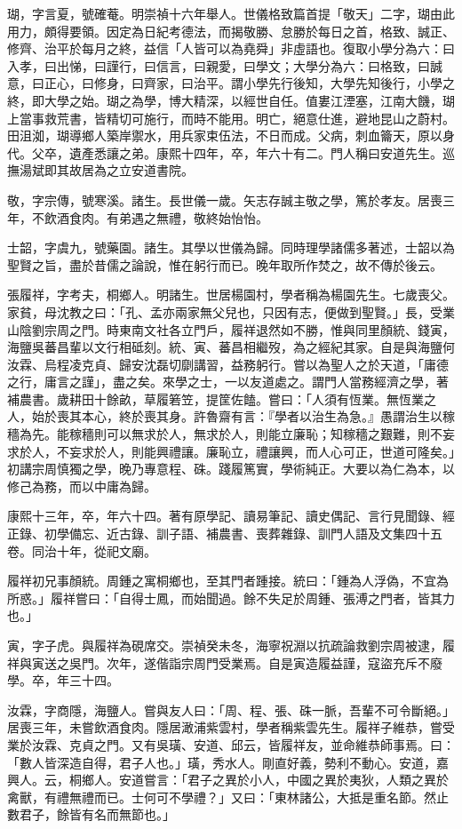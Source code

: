 \begin{pinyinscope}
瑚，字言夏，號確菴。明崇禎十六年舉人。世儀格致篇首提「敬天」二字，瑚由此用力，頗得要領。因定為日紀考德法，而揭敬勝、怠勝於每日之首，格致、誠正、修齊、治平於每月之終，益信「人皆可以為堯舜」非虛語也。復取小學分為六：曰入孝，曰出悌，曰謹行，曰信言，曰親愛，曰學文；大學分為六：曰格致，曰誠意，曰正心，曰修身，曰齊家，曰治平。謂小學先行後知，大學先知後行，小學之終，即大學之始。瑚之為學，博大精深，以經世自任。值婁江湮塞，江南大饑，瑚上當事救荒書，皆精切可施行，而時不能用。明亡，絕意仕進，避地昆山之蔚村。田沮洳，瑚導鄉人築岸禦水，用兵家束伍法，不日而成。父病，刺血籥天，原以身代。父卒，遺產悉讓之弟。康熙十四年，卒，年六十有二。門人稱曰安道先生。巡撫湯斌即其故居為之立安道書院。

敬，字宗傳，號寒溪。諸生。長世儀一歲。矢志存誠主敬之學，篤於孝友。居喪三年，不飲酒食肉。有弟遇之無禮，敬終始怡怡。

士韶，字虞九，號藥園。諸生。其學以世儀為歸。同時理學諸儒多著述，士韶以為聖賢之旨，盡於昔儒之論說，惟在躬行而已。晚年取所作焚之，故不傳於後云。

張履祥，字考夫，桐鄉人。明諸生。世居楊園村，學者稱為楊園先生。七歲喪父。家貧，母沈教之曰：「孔、孟亦兩家無父兒也，只因有志，便做到聖賢。」長，受業山陰劉宗周之門。時東南文社各立門戶，履祥退然如不勝，惟與同里顏統、錢寅，海鹽吳蕃昌輩以文行相砥刻。統、寅、蕃昌相繼歿，為之經紀其家。自是與海鹽何汝霖、烏程凌克貞、歸安沈磊切劘講習，益務躬行。嘗以為聖人之於天道，「庸德之行，庸言之謹」，盡之矣。來學之士，一以友道處之。謂門人當務經濟之學，著補農書。歲耕田十餘畝，草履箬笠，提筐佐饁。嘗曰：「人須有恆業。無恆業之人，始於喪其本心，終於喪其身。許魯齋有言：『學者以治生為急。』愚謂治生以稼穡為先。能稼穡則可以無求於人，無求於人，則能立廉恥；知稼穡之艱難，則不妄求於人，不妄求於人，則能興禮讓。廉恥立，禮讓興，而人心可正，世道可隆矣。」初講宗周慎獨之學，晚乃專意程、硃。踐履篤實，學術純正。大要以為仁為本，以修己為務，而以中庸為歸。

康熙十三年，卒，年六十四。著有原學記、讀易筆記、讀史偶記、言行見聞錄、經正錄、初學備忘、近古錄、訓子語、補農書、喪葬雜錄、訓門人語及文集四十五卷。同治十年，從祀文廟。

履祥初兄事顏統。周鍾之寓桐鄉也，至其門者踵接。統曰：「鍾為人浮偽，不宜為所惑。」履祥嘗曰：「自得士鳳，而始聞過。餘不失足於周鍾、張溥之門者，皆其力也。」

寅，字子虎。與履祥為硯席交。崇禎癸未冬，海寧祝淵以抗疏論救劉宗周被逮，履祥與寅送之吳門。次年，遂偕詣宗周門受業焉。自是寅造履益謹，寇盜充斥不廢學。卒，年三十四。

汝霖，字商隱，海鹽人。嘗與友人曰：「周、程、張、硃一脈，吾輩不可令斷絕。」居喪三年，未嘗飲酒食肉。隱居澉浦紫雲村，學者稱紫雲先生。履祥子維恭，嘗受業於汝霖、克貞之門。又有吳璜、安道、邱云，皆履祥友，並命維恭師事焉。曰：「數人皆深造自得，君子人也。」璜，秀水人。剛直好義，勢利不動心。安道，嘉興人。云，桐鄉人。安道嘗言：「君子之異於小人，中國之異於夷狄，人類之異於禽獸，有禮無禮而已。士何可不學禮？」又曰：「東林諸公，大抵是重名節。然止數君子，餘皆有名而無節也。」


\end{pinyinscope}
